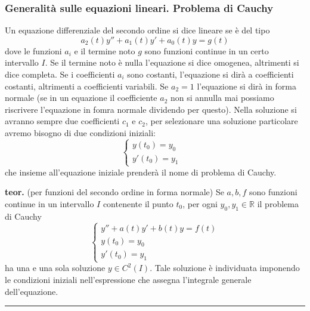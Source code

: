 \subsubsection{Generalità sulle equazioni lineari. Problema di Cauchy}
Un equazione differenziale del secondo ordine si dice lineare se è del tipo
\[
    a_2(t) y'' + a_1(t) y' +a_0(t) y = g(t)
\]
dove le funzioni $a_i$ e il termine noto $g$ sono funzioni continue in un certo intervallo $I$.\newline
Se il termine noto è nulla l'equazione si dice omogenea, altrimenti si dice completa.\newline
Se i coefficienti $a_i$ sono costanti, l'equazione si dirà a coefficienti costanti, altrimenti a coefficienti variabili.\newline
Se $a_2 = 1$ l'equazione si dirà in forma normale (se in un equazione il coefficiente $a_2$ non si annulla mai possiamo riscrivere l'equazione in fomra normale dividendo per questo).\newline
\newline
Nella soluzione si avranno sempre due coefficienti $c_1$ e $c_2$, per selezionare una soluzione particolare avremo bisogno di due condizioni iniziali:
\[
    \begin{cases}
        y(t_0) = y_0&\\
        y'(t_0) = y_1
    \end{cases}
\]
che insieme all'equazione iniziale prenderà il nome di problema di Cauchy.\newline
\newline
\begin{tcolorbox}
\textbf{teor.} (per funzioni del secondo ordine in forma normale)\newline
Se $a, b, f$ sono funzioni continue in un intervallo $I$ contenente il punto $t_0$, per ogni $y_0, y_1 \in \mathbb{R}$ il problema di Cauchy
\[
    \begin{cases}
        y'' + a(t) y' + b(t) y = f(t)\\
        y(t_0) = y_0\\
        y'(t_0) = y_1
    \end{cases}
\]
ha una e una sola soluzione $y \in C^2(I)$.\newline
Tale soluzione è individuata imponendo le condizioni iniziali nell'espressione che assegna l'integrale generale dell'equazione.\newline
\end{tcolorbox}
\rule{\textwidth}{0,4pt}
